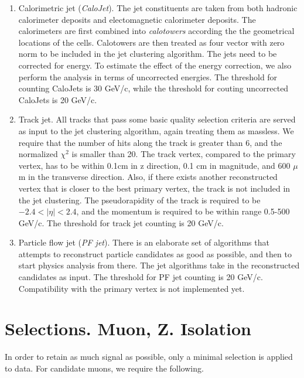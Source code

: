 \documentclass[10pt,a4paper,onecolumn]{article}
\begin{document}
\begin{enumerate}
\item Calorimetric jet (\emph{CaloJet}).  The jet constituents are taken from both hadronic calorimeter deposits and electomagnetic calorimeter deposits.
   The calorimeters are first combined into \emph{calotowers} according the the geometrical locations of the cells.
   Calotowers are then treated as four vector with zero norm to be included in the jet clustering algorithm.
   The jets need to be corrected for energy.  To estimate the effect of the energy correction, we also perform the analysis in terms of uncorrected energies.
   The threshold for counting CaloJets is 30 GeV/c, while the threshold for couting uncorrected CaloJets is 20 GeV/c.
\item Track jet.  All tracks that pass some basic quality selection criteria are served as input to the jet clustering algorithm, again treating them as massless.
   We require that the number of hits along the track is greater than 6, and the normalized $\chi^2$ is smaller than 20.
   The track vertex, compared to the primary vertex, has to be within 0.1cm in z direction, 0.1 cm in magnitude, and 600 $\mu$m in the transverse direction.
   Also, if there exists another reconstructed vertex that is closer to the best primary vertex, the track is not included in the jet clustering.
   The pseudorapidity of the track is required to be $-2.4 < |\eta| < 2.4$, and the momentum is required to be within range 0.5-500 GeV/c.
   The threshold for track jet counting is 20 GeV/c.
\item Particle flow jet (\emph{PF jet}).  There is an elaborate set of algorithms that attempts to reconstruct particle candidates as good as possible,
   and then to start physics analysis from there.  The jet algorithms take in the reconstructed candidates as input.
   The threshold for PF jet counting is 20 GeV/c.  Compatibility with the primary vertex is not implemented yet.
\end{enumerate}

\section{Selections.  Muon, Z.  Isolation}

In order to retain as much signal as possible, only a minimal selection is applied to data.
For candidate muons, we require the following.
\end{document}

